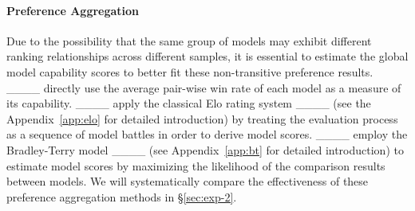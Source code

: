 \paragraph{Preference Aggregation}
\label{sec:2-pa}
Due to the possibility that the same group of models may exhibit different ranking relationships across different samples, it is essential to estimate the global model capability scores to better fit these non-transitive preference results.
____ directly use the average pair-wise win rate of each model as a measure of its capability. 
____ apply the classical Elo rating system ____ (see the Appendix~\ref{app:elo} for detailed introduction) by treating the evaluation process as a sequence of model battles in order to derive model scores. 
____ employ the Bradley-Terry model ____ (see Appendix~\ref{app:bt} for detailed introduction) to estimate model scores by maximizing the likelihood of the comparison results between models. We will systematically compare the effectiveness of these preference aggregation methods in \S\ref{sec:exp-2}.
